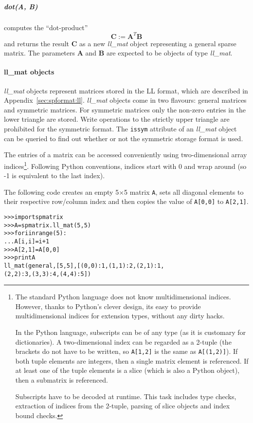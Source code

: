 \documentclass[a4paper]{article}
\newcommand{\mat}[1]{\ensuremath{\boldsymbol{#1}}}
\newlength{\pyindent} \newlength{\pyminipagewidth}
\newenvironment{pyinline}{\begin{trivlist}\item\hspace*{\pyindent}\begin{minipage}{\pyminipagewidth}\small\begin{alltt}}
      {\end{alltt}\end{minipage}\end{trivlist}}
\begin{document}
\subparagraph{dot(A, B)}
%
computes the ``dot-product''
\begin{equation*}
  \mat{C} := \mat{A}^T\mat{B}
\end{equation*}
and returns the result $\mat{C}$ as a new \textit{ll\_mat} object
representing a general sparse matrix. The parameters $\mat{A}$ and
$\mat{B}$ are expected to be objects of type \textit{ll\_mat}.

\paragraph{ll\_mat objects}
%
\textit{ll\_mat} objects represent matrices stored in the LL format,
which are described in Appendix~\ref{sec:spformat:ll}.
\textit{ll\_mat} objects come in two flavours: general matrices and
symmetric matrices.  For symmetric matrices only the non-zero entries
in the lower triangle are stored.  Write operations to the strictly
upper triangle are prohibited for the symmetric format.  The
\texttt{issym} attribute of an \textit{ll\_mat} object can be queried
to find out whether or not the symmetric storage format is used.

The entries of a matrix can be accessed conveniently using
two-dimensional array indices\footnote{The standard Python language
  does not know multidimensional indices.  However, thanks to Python's
  clever design, its easy to provide multidimensional indices for
  extension types, without any dirty hacks.
  
  In the Python language, subscripts can be of any type (as it is
  customary for dictionaries). A two-dimensional index can be regarded
  as a 2-tuple (the brackets do not have to be written, so
  \texttt{A[1,2]} is the same as \texttt{A[(1,2)]}). If both tuple
  elements are integers, then a single matrix element is referenced.
  If at least one of the tuple elements is a slice (which is also a
  Python object), then a submatrix is referenced.

Subscripts have to be decoded at runtime. This task includes type
checks, extraction of indices from the 2-tuple, parsing of slice
objects and index bound checks. }.  Following Python conventions,
indices start with 0 and wrap around (so -1 is equivalent to the last
index).

The following code creates an empty 5$\times$5 matrix \texttt{A}, sets
all diagonal elements to their respective row/column index and then
copies the value of \texttt{A[0,0]} to \texttt{A[2,1]}.
\begin{pyinline}
>>> import spmatrix
>>> A = spmatrix.ll_mat(5, 5)
>>> for i in range(5):
...     A[i,i] = i+1
>>> A[2,1] = A[0,0]
>>> print A
ll_mat(general, [5,5], [(0,0): 1, (1,1): 2, (2,1): 1,
(2,2): 3, (3,3): 4, (4,4): 5])
\end{pyinline}
\end{document}
